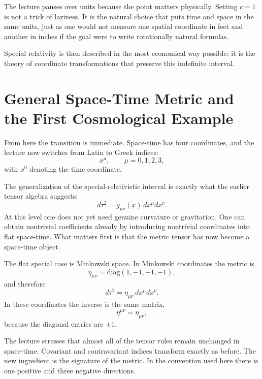 The lecture pauses over units because the point matters physically. Setting \(c=1\) is not a trick of laziness. It is the natural choice that puts time and space in the same units, just as one would not measure one spatial coordinate in feet and another in inches if the goal were to write rotationally natural formulas.

Special relativity is then described in the most economical way possible: it is the theory of coordinate transformations that preserve this indefinite interval.

\section{General Space-Time Metric and the First Cosmological Example}

From here the transition is immediate. Space-time has four coordinates, and the lecture now switches from Latin to Greek indices:
\[
x^\mu,\qquad \mu=0,1,2,3,
\]
with \(x^0\) denoting the time coordinate.

The generalization of the special-relativistic interval is exactly what the earlier tensor algebra suggests:
\begin{equation}
d\tau^2=g_{\mu\nu}(x)\,dx^\mu dx^\nu.
\end{equation}
At this level one does not yet need genuine curvature or gravitation. One can obtain nontrivial coefficients already by introducing nontrivial coordinates into flat space-time. What matters first is that the metric tensor has now become a space-time object.

The flat special case is Minkowski space. In Minkowski coordinates the metric is
\begin{equation}
\eta_{\mu\nu}=
\mathrm{diag}(1,-1,-1,-1),
\end{equation}
and therefore
\begin{equation}
d\tau^2=\eta_{\mu\nu}\,dx^\mu dx^\nu.
\end{equation}
In these coordinates the inverse is the same matrix,
\begin{equation}
\eta^{\mu\nu}=\eta_{\mu\nu},
\end{equation}
because the diagonal entries are \(\pm1\).

The lecture stresses that almost all of the tensor rules remain unchanged in space-time. Covariant and contravariant indices transform exactly as before. The new ingredient is the signature of the metric. In the convention used here there is one positive and three negative directions.

